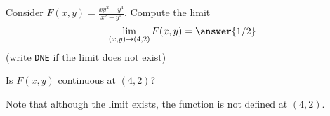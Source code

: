 \documentclass{ximera}
\author{Jim Talamo \and Bart Snapp}
\newcommand{\point}[1]{\left(#1\right)} %
\begin{document}
\begin{exercise}
  Consider $F(x,y) = \frac{xy^2-y^4}{x^2-y^4}$.  Compute the limit
  \[
  \lim_{\point{x,y}\to \point{4,2}} F(x,y) = \answer{1/2}
  \]
  (write \verb|DNE| if the limit does not exist)
  
  \begin{exercise}
  Is $F(x,y)$ continuous at $(4,2)$?
  \begin{multipleChoice}
  \end{multipleChoice}
  
\begin{feedback}[correct]
Note that although the limit exists, the function is not defined at $(4,2)$.
\end{feedback}
  \end{exercise}
\end{exercise}
\end{document}

